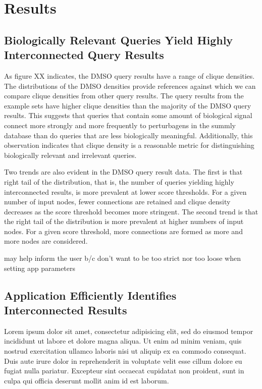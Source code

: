 \documentclass[12pt]{article}
\begin{document}
\section{Results}

\subsection{Biologically Relevant Queries Yield Highly Interconnected Query Results}
As figure XX indicates, the DMSO query results have a range of clique densities. The distributions of the DMSO densities provide references against which we can compare clique densities from other query results. The query results from the example sets have higher clique densities than the majority of the DMSO query results. This suggests that queries that contain some amount of biological signal connect more strongly and more frequently to perturbagens in the summly database than do queries that are less biologically meaningful. Additionally, this observation indicates that clique density is a reasonable metric for distinguishing biologically relevant and irrelevant queries.

Two trends are also evident in the DMSO query result data. The first is that right tail of the distribution, that is, the number of queries yielding highly interconnected results, is more prevalent at lower score thresholds. For a given number of input nodes, fewer connections are retained and clique density decreases as the score threshold becomes more stringent. The second trend is that the right tail of the distribution is more prevalent at higher numbers of input nodes. For a given score threshold, more connections are formed as more and more nodes are considered. 

may help inform the user b/c don't want to be too strict nor too loose when setting app parameters



\subsection{Application Efficiently Identifies Interconnected Results}
Lorem ipsum dolor sit amet, consectetur adipisicing elit, sed do eiusmod tempor incididunt ut labore et dolore magna aliqua. Ut enim ad minim veniam, quis nostrud exercitation ullamco laboris nisi ut aliquip ex ea commodo consequat. Duis aute irure dolor in reprehenderit in voluptate velit esse cillum dolore eu fugiat nulla pariatur. Excepteur sint occaecat cupidatat non proident, sunt in culpa qui officia deserunt mollit anim id est laborum.
\end{document}
